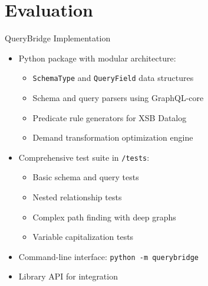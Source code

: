 \documentclass{beamer}
\begin{document}
\section{Evaluation}
\begin{frame}{QueryBridge Implementation}
  \begin{itemize}
    \item Python package with modular architecture:
    \begin{itemize}
      \item \texttt{SchemaType} and \texttt{QueryField} data structures
      \item Schema and query parsers using GraphQL-core
      \item Predicate rule generators for XSB Datalog
      \item Demand transformation optimization engine
    \end{itemize}
    \item Comprehensive test suite in \texttt{/tests}:
    \begin{itemize}
      \item Basic schema and query tests
      \item Nested relationship tests
      \item Complex path finding with deep graphs
      \item Variable capitalization tests
    \end{itemize}
    \item Command-line interface: \texttt{python -m querybridge}
    \item Library API for integration
  \end{itemize}
\end{frame}

\end{document}
